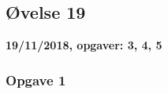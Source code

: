 \horizline

\subsection{Øvelse 19}

\textbf{19/11/2018, opgaver: 3, 4, 5}

\subsubsection{Opgave 1}

